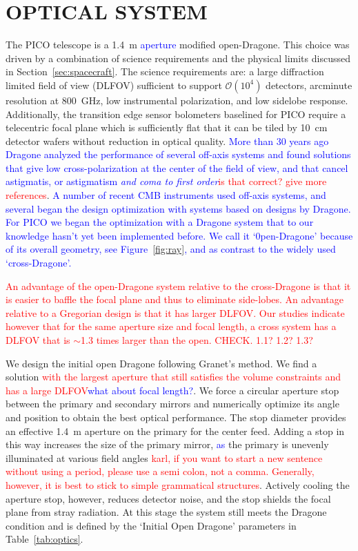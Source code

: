 \documentclass[]{spie}  %
\newcommand{\comr}[1]{\textcolor{red}{#1}}
\newcommand{\comb}[1]{\textcolor{blue}{#1}}
\begin{document}
\section{OPTICAL SYSTEM}
\label{sec:optics}

The PICO telescope is a 1.4~m \comb{aperture} modified open-Dragone.  This choice was driven by a combination of science
requirements and the physical limits discussed in Section~\ref{sec:spacecraft}.  The science requirements are: a large diffraction 
limited field of view (DLFOV) sufficient to support $\mathcal{O}(10^4)$ detectors, arcminute resolution at 800~GHz, low 
instrumental polarization, and low sidelobe response. Additionally, 
the transition edge sensor bolometers baselined for PICO require a telecentric focal plane which is sufficiently flat that it 
can be tiled by 10~cm detector wafers without reduction in optical quality. \comb{More than 30 years ago Dragone analyzed the 
performance of several off-axis systems and found solutions that give low cross-polarization at the center of the field 
of view, and that cancel astigmatis, or astigmatism \it{and} coma to first order}\cite{dragone}\comr{is that correct? give more references}.  
\comb{A number of recent CMB instruments used off-axis systems, and several 
began the design optimization with systems based on designs by
Dragone\cite{planck2000_optics,ACT2011_optics,SPT2008_optics,core2018_inst,LB2016_optics}. For PICO we began 
the optimization with a Dragone system that to our knowledge hasn't yet been implemented before. 
We call it `0pen-Dragone' because of its overall geometry, see Figure~\ref{fig:ray}, and as contrast to the widely 
used `cross-Dragone'. }

\comr{An advantage of the open-Dragone system relative to the cross-Dragone is that it is easier to baffle the focal plane
and thus to eliminate side-lobes. An advantage relative to a Gregorian design is that it has larger DLFOV. Our studies 
indicate however that for the same aperture size and focal length, a cross system has a DLFOV that is $\sim$1.3 times 
larger than the open. CHECK. 1.1? 1.2? 1.3?}

We design the initial open Dragone following Granet's method\cite{granet2001}. 
We find a solution \comr{with the largest aperture that still satisfies the volume constraints and has a large 
DLFOV}\comb{what about focal length?}.  We force a circular aperture stop 
between the primary and secondary mirrors and numerically optimize its angle and position to obtain the best 
optical performance.  The stop diameter provides an effective 1.4~m aperture on the primary for the center feed.  
Adding a stop in this way increases the size of the primary mirror, \comb{as} the primary is unevenly illuminated at various 
field angles \comr{karl, if you want to start a new sentence without using a period, please use a semi colon, not a comma. Generally, 
however, it is best to stick to simple grammatical structures}. 
Actively cooling the aperture stop, however, reduces detector noise, and the stop shields the 
focal plane from stray radiation. At this stage the system still meets 
the Dragone condition and is defined by the `Initial Open Dragone' parameters in Table~\ref{tab:optics}.
\end{document}
